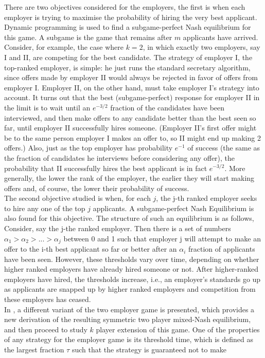 \documentclass{article}
\begin{document}
There are two objectives considered for the employers, the first is when each employer is trying to maximise the probability of hiring the very best applicant. Dynamic programming is used to find a subgame-perfect Nash equilibrium for this game. A subgame is the game that remains after $m$ applicants have arrived. Consider, for example, the case where $k = 2$, in which exactly two employers, say I and II, are competing for the best candidate. The strategy of employer I, the top-ranked employer, is simple: he just runs the standard secretary algorithm, since offers made by employer II would always be rejected in favor of offers from employer I. Employer II, on the other hand, must take employer I’s strategy into account. It turns out that the best (subgame-perfect) response for employer II in the limit is to wait until an $e^{-3/2}$ fraction of the candidates have been interviewed, and then make offers to any candidate better than the best seen so far, until employer II successfully hires someone. (Employer II’s first offer might be to the same person employer I makes an offer to, so II might end up making 2 offers.) Also, just as the top employer has probability $e^{-1}$ of success (the same as the fraction of candidates he interviews before considering any offer), the probability that II successfully hires the best applicant is in fact $e^{-3/2}$. More generally, the lower the rank of the employer, the earlier they will start making offers and, of course, the lower their probability of success.
\\[2ex]
The second objective studied is when, for each $j$, the j-th ranked employer seeks to hire any one of the top $j$ applicants. A subgame-perfect Nash Equilibrium is also found for this objective. The structure of such an equilibrium is as follows, Consider, say the j-the ranked employer. Then there is a set of numbers $\alpha_1 > \alpha_2 > ... > \alpha_j $ between 0 and 1 such that employer j will attempt to make an offer to the i-th best applicant so far or better after an $\alpha_i $ fraction of applicants have been seen. However, these thresholds vary over time, depending on whether higher ranked employers have already hired someone or not. After higher-ranked employers have hired, the thresholds increase, i.e., an employer’s standards go up as applicants are snapped up by higher ranked employers and competition from these employers has ceased.
\\[2ex]
In \cite{immorlica2006secretary}, a different variant of the two employer game is presented, which provides a new derivation of the resulting symmetric two player mixed-Nash equilibrium, and then proceed to study $k$ player extension of this game. One of the properties of any strategy for the employer game is its threshold time, which is defined as the largest fraction $\tau$ such that the strategy is guaranteed not to make
\end{document}
